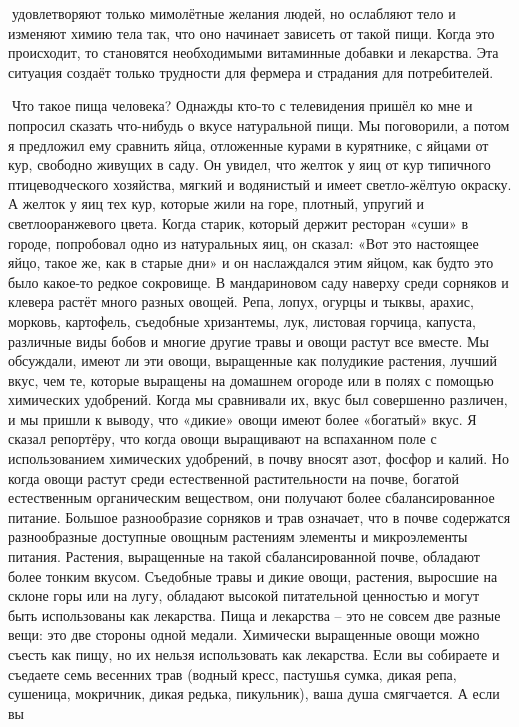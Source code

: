 \documentclass[a4paper]{book}
\begin{document}
удовлетворяют только мимолётные желания людей, но ослабляют тело и изменяют химию
тела так, что оно начинает зависеть от такой пищи. Когда это происходит, то становятся
необходимыми витаминные добавки и лекарства. Эта ситуация создаёт только трудности для
фермера и страдания для потребителей.

Что такое пища человека?
Однажды кто-то с телевидения пришёл ко мне и попросил сказать что-нибудь о вкусе
натуральной пищи. Мы поговорили, а потом я предложил ему сравнить яйца, отложенные
курами в курятнике, с яйцами от кур, свободно живущих в саду. Он увидел, что желток у яиц
от кур типичного птицеводческого хозяйства, мягкий и водянистый и имеет светло-жёлтую
окраску. А желток у яиц тех кур, которые жили на горе, плотный, упругий и светлооранжевого цвета. Когда старик, который держит ресторан «суши» в городе, попробовал одно
из натуральных яиц, он сказал: «Вот это настоящее яйцо, такое же, как в старые дни» и он
наслаждался этим яйцом, как будто это было какое-то редкое сокровище.
В мандариновом саду наверху среди сорняков и клевера растёт много разных овощей.
Репа, лопух, огурцы и тыквы, арахис, морковь, картофель, съедобные хризантемы, лук,
листовая горчица, капуста, различные виды бобов и многие другие травы и овощи растут все
вместе. Мы обсуждали, имеют ли эти овощи, выращенные как полудикие растения, лучший
вкус, чем те, которые выращены на домашнем огороде или в полях с помощью химических
удобрений. Когда мы сравнивали их, вкус был совершенно различен, и мы пришли к выводу,
что «дикие» овощи имеют более «богатый» вкус.
Я сказал репортёру, что когда овощи выращивают на вспаханном поле с использованием
химических удобрений, в почву вносят азот, фосфор и калий. Но когда овощи растут среди
естественной растительности на почве, богатой естественным органическим веществом,
они получают более сбалансированное питание. Большое разнообразие сорняков и трав
означает, что в почве содержатся разнообразные доступные овощным растениям элементы и
микроэлементы питания. Растения, выращенные на такой сбалансированной почве,
обладают более тонким вкусом.
Съедобные травы и дикие овощи, растения, выросшие на склоне горы или на лугу,
обладают высокой питательной ценностью и могут быть использованы как лекарства. Пища
и лекарства – это не совсем две разные вещи: это две стороны одной медали. Химически
выращенные овощи можно съесть как пищу, но их нельзя использовать как лекарства.
Если вы собираете и съедаете семь весенних трав (водный кресс, пастушья сумка, дикая
репа, сушеница, мокричник, дикая редька, пикульник), ваша душа смягчается. А если вы
\end{document}
